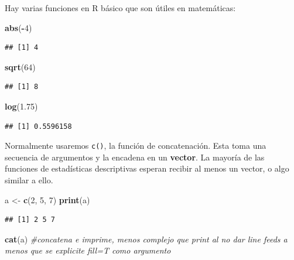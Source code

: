 \documentclass[
]{article}
\newenvironment{Shaded}{\begin{snugshade}}{\end{snugshade}}
\newcommand{\CommentTok}[1]{\textcolor[rgb]{0.56,0.35,0.01}{\textit{#1}}}
\newcommand{\DecValTok}[1]{\textcolor[rgb]{0.00,0.00,0.81}{#1}}
\newcommand{\FloatTok}[1]{\textcolor[rgb]{0.00,0.00,0.81}{#1}}
\newcommand{\FunctionTok}[1]{\textcolor[rgb]{0.13,0.29,0.53}{\textbf{#1}}}
\newcommand{\NormalTok}[1]{#1}
\newcommand{\OtherTok}[1]{\textcolor[rgb]{0.56,0.35,0.01}{#1}}
\newcommand{\SpecialCharTok}[1]{\textcolor[rgb]{0.81,0.36,0.00}{\textbf{#1}}}
\begin{document}
Hay varias funciones en R básico que son útiles en matemáticas:

\begin{Shaded}
\begin{Highlighting}[]
\FunctionTok{abs}\NormalTok{(}\SpecialCharTok{{-}}\DecValTok{4}\NormalTok{)}
\end{Highlighting}
\end{Shaded}

\begin{verbatim}
## [1] 4
\end{verbatim}

\begin{Shaded}
\begin{Highlighting}[]
\FunctionTok{sqrt}\NormalTok{(}\DecValTok{64}\NormalTok{)}
\end{Highlighting}
\end{Shaded}

\begin{verbatim}
## [1] 8
\end{verbatim}

\begin{Shaded}
\begin{Highlighting}[]
\FunctionTok{log}\NormalTok{(}\FloatTok{1.75}\NormalTok{)}
\end{Highlighting}
\end{Shaded}

\begin{verbatim}
## [1] 0.5596158
\end{verbatim}

Normalmente usaremos \texttt{c()}, la función de concatenación. Esta
toma una secuencia de argumentos y la encadena en un \textbf{vector}. La
mayoría de las funciones de estadísticas descriptivas esperan recibir al
menos un vector, o algo similar a ello.

\begin{Shaded}
\begin{Highlighting}[]
\NormalTok{a }\OtherTok{\textless{}{-}} \FunctionTok{c}\NormalTok{(}\DecValTok{2}\NormalTok{, }\DecValTok{5}\NormalTok{, }\DecValTok{7}\NormalTok{)}
\FunctionTok{print}\NormalTok{(a)}
\end{Highlighting}
\end{Shaded}

\begin{verbatim}
## [1] 2 5 7
\end{verbatim}

\begin{Shaded}
\begin{Highlighting}[]
\FunctionTok{cat}\NormalTok{(a) }\CommentTok{\#concatena e imprime, menos complejo que print al no dar line feeds a menos que se explicite fill=T como argumento}
\end{Highlighting}
\end{Shaded}
\end{document}
